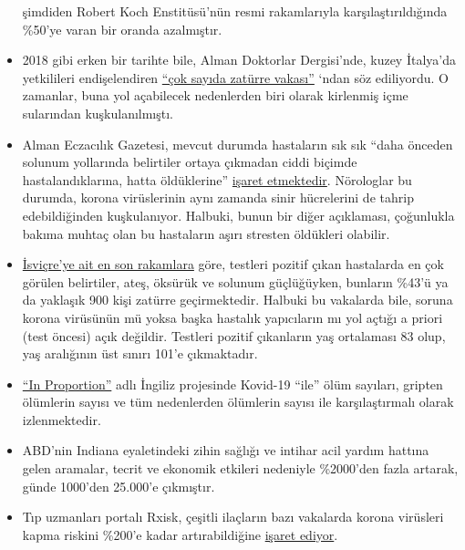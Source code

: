 \begin{itemize}
  şimdiden Robert Koch Enstitüsü'nün resmi rakamlarıyla
  karşılaştırıldığında \%50'ye varan bir oranda azalmıştır.
\item
  2018 gibi erken bir tarihte bile, Alman Doktorlar Dergisi'nde, kuzey
  İtalya'da yetkilileri endişelendiren
  \href{https://www.aerzteblatt.de/nachrichten/97750/Vielzahl-an-Lungenentzuendungen-beunruhigen-Behoerden-in-Norditalien}{``çok
  sayıda zatürre vakası''} `ndan söz ediliyordu. O zamanlar, buna yol
  açabilecek nedenlerden biri olarak kirlenmiş içme sularından
  kuşkulanılmıştı.
\item
  Alman Eczacılık Gazetesi, mevcut durumda hastaların sık sık ``daha
  önceden solunum yollarında belirtiler ortaya çıkmadan ciddi biçimde
  hastalandıklarına, hatta öldüklerine''
  \href{https://www.pharmazeutische-zeitung.de/atemstillstand-koennte-auch-zentrale-ursache-haben-116664/}{işaret
  etmektedir}. Nörologlar bu durumda, korona virüslerinin aynı zamanda
  sinir hücrelerini de tahrip edebildiğinden kuşkulanıyor. Halbuki,
  bunun bir diğer açıklaması, çoğunlukla bakıma muhtaç olan bu
  hastaların aşırı stresten öldükleri olabilir.
\item
  \href{https://www.bag.admin.ch/dam/bag/de/dokumente/mt/k-und-i/aktuelle-ausbrueche-pandemien/2019-nCoV/covid-19-lagebericht.pdf.download.pdf/COVID-19_Epidemiologische_Lage_Schweiz.pdf}{İsviçre'ye
  ait en son rakamlara} göre, testleri pozitif çıkan hastalarda en çok
  görülen belirtiler, ateş, öksürük ve solunum güçlüğüyken, bunların
  \%43'ü ya da yaklaşık 900 kişi zatürre geçirmektedir. Halbuki bu
  vakalarda bile, soruna korona virüsünün mü yoksa başka hastalık
  yapıcıların mı yol açtığı a priori (test öncesi) açık değildir.
  Testleri pozitif çıkanların yaş ortalaması 83 olup, yaş aralığının üst
  sınırı 101'e çıkmaktadır.
\item
  \href{http://inproportion2.talkigy.com/}{``In Proportion''} adlı
  İngiliz projesinde Kovid-19 ``ile'' ölüm sayıları, gripten ölümlerin
  sayısı ve tüm nedenlerden ölümlerin sayısı ile karşılaştırmalı olarak
  izlenmektedir.
\item
  ABD'nin Indiana eyaletindeki zihin sağlığı ve intihar acil yardım
  hattına gelen aramalar, tecrit ve ekonomik etkileri nedeniyle
  \%2000'den fazla artarak, günde 1000'den 25.000'e çıkmıştır.
\item
  Tıp uzmanları portalı Rxisk, çeşitli ilaçların bazı vakalarda korona
  virüsleri kapma riskini \%200'e kadar artırabildiğine
  \href{https://rxisk.org/medications-compromising-covid-infections/}{işaret
  ediyor}.
\end{itemize}

